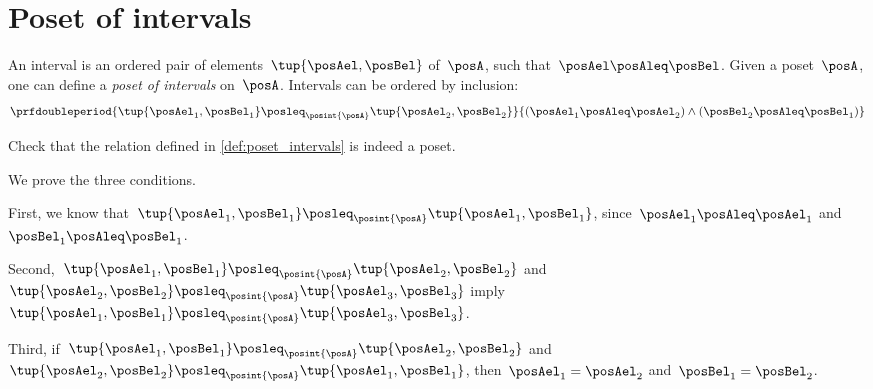 
\section{Poset of intervals}
\begin{definition}
    \label{def:poset_intervals}
    An interval is an ordered pair of elements~$\tup{\posAel,\posBel}$ of~$\posA$, such that~$\posAel \posAleq \posBel$.
    Given a poset~$\posA$, one can define a \emph{poset of intervals} on~$\posA$.
    Intervals can be ordered by inclusion:
    \begin{equation}
        \prfdoubleperiod{\tup{\posAel_1,\posBel_1}\posleq_{\posint{\posA}}\tup{\posAel_2,\posBel_2} }{ (\posAel_1\posAleq \posAel_2)\wedge (\posBel_2\posAleq \posBel_1)}
    \end{equation}
\end{definition}

\begin{exercise}
    Check that the relation defined in \cref{def:poset_intervals} is indeed a poset.
\end{exercise}
\begin{solution}
    We prove the three conditions.
    \begin{compactitem}
        \item First, we know that~$\tup{\posAel_1,\posBel_1}\posleq_{\posint{\posA}}\tup{\posAel_1,\posBel_1}$, since~$\posAel_1\posAleq \posAel_1$ and~$\posBel_1\posAleq \posBel_1$.
        \item Second,~$\tup{\posAel_1,\posBel_1}\posleq_{\posint{\posA}}\tup{\posAel_2,\posBel_2}$ and~$\tup{\posAel_2,\posBel_2}\posleq_{\posint{\posA}}\tup{\posAel_3,\posBel_3}$ imply~$\tup{\posAel_1,\posBel_1}\posleq_{\posint{\posA}}\tup{\posAel_3,\posBel_3}$.
        \item Third, if~$\tup{\posAel_1,\posBel_1}\posleq_{\posint{\posA}}\tup{\posAel_2,\posBel_2}$ and~$\tup{\posAel_2,\posBel_2}\posleq_{\posint{\posA}}\tup{\posAel_1,\posBel_1}$, then~$\posAel_1=\posAel_2$ and~$\posBel_1=\posBel_2$.
    \end{compactitem}
\end{solution}
